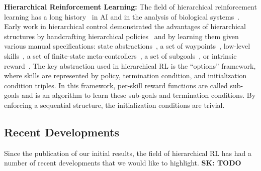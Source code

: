 \vspace{0.5em}\noindent\textbf{Hierarchical Reinforcement Learning: } 
The field of hierarchical reinforcement learning has a long history~\citep{parr98,suttonPS99,barto03} in AI and in the analysis of biological systems~\citep{botvinick08,botvinick2009hierarchically,solway2014optimal,zacksKEH11,whitenFBL06}.
Early work in hierarchical control demonstrated the advantages of hierarchical structures by handcrafting hierarchical policies~\citep{brooks1986robust} and by learning them given various manual specifications: state abstractions~\citep{dayanH92,hengst02,kolterAN07,konidarisB07}, a set of waypoints~\citep{kaelbling93}, low-level skills~\citep{huberG97,baconP15,liaw17composing}, a set of finite-state meta-controllers~\citep{parrR97}, a set of subgoals~\citep{suttonPS99,dietterich00}, or intrinsic reward~\citep{kulkarni2016hierarchical}.
The key abstraction used in hierarchical RL is the ``options'' framework, where skills are represented by policy, termination condition, and initialization condition triples.
In this framework, per-skill reward functions are called sub-goals and \hirl is an algorithm to learn these sub-goals and termination conditions. 
By enforcing a sequential structure, the initialization conditions are trivial.


\subsection{Recent Developments}
Since the publication of our initial results, the field of hierarchical RL has had a number of recent developments that we would like to highlight.
\textbf{SK: TODO}
